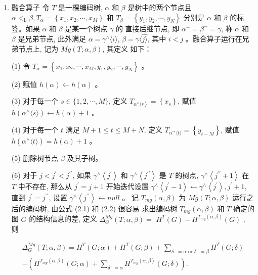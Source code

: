 \documentclass[a4paper]{apa6}
\begin{document}
\begin{enumerate}
\item 融合算子
\label{sec:orge7469f9}
令 \(T\) 是一棵编码树, \(\alpha\) 和 \(\beta\) 是树中的两个节点且 \(\alpha<_{\mathrm{L}} \beta, T_{\alpha}=\left\{x_{1}, x_{2}, \cdots, x_{M}\right\}\) 和 \(T_{\beta}=\left\{y_{1}, y_{2}, \cdots, y_{N}\right\}\) 分别是 \(\alpha\) 和 \(\beta\) 的标签。如果 \(\alpha\) 和 \(\beta\) 是某一个树点 \(\gamma\) 的 直接后继节点, 即 \(\alpha^{-}=\beta^{-}=\gamma\), 称 \(\alpha\) 和 \(\beta\) 是兄弟节点, 此外满足 \(\alpha=\gamma^{\wedge}\langle i\rangle\), \(\beta=\gamma \hat{\langle j\rangle}\), 其中 \(i<j\) 。融合算子运行在兄弟节点上, 记为 \(M g(T ; \alpha, \beta)\), 其定义 如下：

(1) 令 \(T_{\alpha}=\left\{x_{1}, x_{2}, \cdots, x_{M}, y_{1}, y_{2}, \cdots, y_{N}\right\}\) 。

(2) 赋值 \(h(\alpha) \leftarrow h(\alpha)\) 。

(3) 对于每一个 \(s \in\{1,2, \cdots, M\}\), 定义 \(T_{\left.\alpha^{\wedge} \langle s\right\rangle}=\left\{x_{s}\right\}\), 赋值 \(h\left(\alpha^{\wedge}\langle s\rangle\right) \leftarrow h(\alpha)+1\) 。

(4) 对于每一个 \(t\) 满足 \(M+1 \leq t \leq M+N\), 定义 \(T_{\alpha^{\curvearrowright}\langle t\rangle}=\left\{y_{t-M}\right\}\), 赋值 \(h\left(\alpha^{\wedge}\langle t\rangle\right)=h(\alpha)+1\) 。

(5) 删除树节点 \(\beta\) 及其子树。

(6) 对于 \(j<j^{\prime}<j^{\prime \prime}\), 如果 \(\gamma^{\wedge}\left\langle j^{\prime}\right\rangle\) 和 \(\gamma^{\wedge}\left\langle j^{\prime \prime}\right\rangle\) 是 \(T\) 的树点, \(\gamma^{\wedge}\left\langle j^{\prime \prime}+1\right\rangle\) 在 \(T\) 中不存在, 那么从 \(j^{\prime}=j+1\) 开始迭代设置 \(\gamma^{\wedge}\left\langle j^{\prime}-1\right\rangle \leftarrow \gamma^{\wedge}\left\langle j^{\prime}\right\rangle, j^{\prime}+1\), 直到 \(j^{\prime}=j^{\prime \prime}\), 设置 \(\gamma^{\wedge}\left\langle j^{\prime \prime}\right\rangle \leftarrow n u l l\) 。
记 \(T_{m g}(\alpha, \beta)\) 为 \(M g(T ; \alpha, \beta)\) 运行之后的编码树, 由公式 (2.1) 和 (2.2) 很容易 求出编码树 \(T_{m g}(\alpha, \beta)\) 和 \(T\) 确定的图 \(G\) 的结构信息的差, 定义 \(\Delta_{G}^{M g}(T ; \alpha, \beta)=\) \(H^{T}(G)-H^{T_{m g}(\alpha, \beta)}(G)\) , 则

$$\begin{array}{r}
\Delta_{G}^{M g}(T ; \alpha, \beta)=H^{T}(G ; \alpha)+H^{T}(G ; \beta)+\sum_{\delta^{-}=\alpha \text { or } \delta^{-}=\beta} H^{T}(G ; \delta) \\
-\left(H^{T_{m g}(\alpha, \beta)}(G ; \alpha)+\sum_{\delta^{-}=\alpha} H^{T_{m g}(\alpha, \beta)}(G ; \delta)\right) .
\end{array}$$


\end{enumerate}
\end{document}
